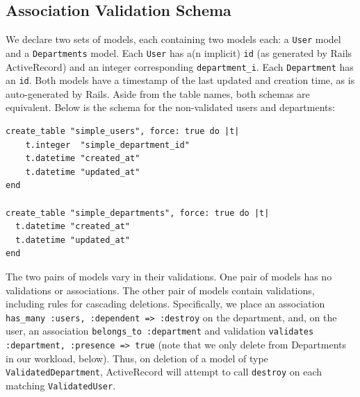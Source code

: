 \subsection{Association Validation Schema}
\label{sec:appendix-association-schema}

We declare two sets of models, each containing two models each: a \texttt{User} model and a \texttt{Departments} model. Each \texttt{User} has a(n implicit) \texttt{id} (as generated by Rails ActiveRecord) and an integer corresponding \texttt{department\_i}. Each \texttt{Department} has an \texttt{id}. Both models have a timestamp of the last updated and creation time, as is auto-generated by Rails. Aside from the table names, both schemas are equivalent. Below is the schema for the non-validated users and departments:\vspace{-.5em}
\begin{lstlisting}
create_table "simple_users", force: true do |t|
    t.integer  "simple_department_id"
    t.datetime "created_at"
    t.datetime "updated_at"
end

create_table "simple_departments", force: true do |t|
  t.datetime "created_at"
  t.datetime "updated_at"
end
\end{lstlisting}\vspace{-.5em}
The two pairs of models vary in their validations. One pair of models has no validations or associations. The other pair of models contain validations, including rules for cascading deletions. Specifically, we place an association \texttt{has\_many :users, :dependent => :destroy} on the department, and, on the user, an association \texttt{belongs\_to :department} and validation \texttt{validates :department, :presence => true} (note that we only delete from Departments in our workload, below). Thus, on deletion of a model of type \texttt{ValidatedDepartment}, ActiveRecord will attempt to call \texttt{destroy} on each matching \texttt{ValidatedUser}.

